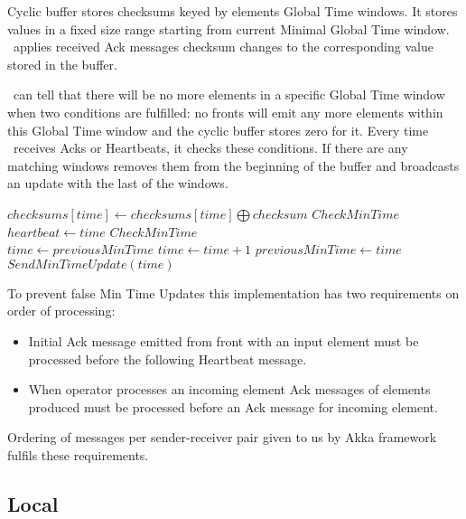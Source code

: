 Cyclic buffer stores checksums keyed by elements Global Time windows. It stores values in a fixed size range starting from current Minimal Global Time window. \tracker\ applies received Ack messages checksum changes to the corresponding value stored in the buffer.

\tracker\ can tell that there will be no more elements in a specific Global Time window when two conditions are fulfilled: no fronts will emit any more elements within this Global Time window and the cyclic buffer stores zero for it. Every time \tracker\ receives Acks or Heartbeats, it checks these conditions. If there are any matching windows \tracker removes them from the beginning of the buffer and broadcasts an update with the last of the windows.

\begin{algorithm}
\caption{\tracker}
\begin{algorithmic}[1]
\State $checksums[time] \gets checksums[time] \bigoplus checksum$
\State $CheckMinTime$
\EndProcedure
\\
\State $heartbeat \gets time$
\State $CheckMinTime$
\EndProcedure
\\
\State $time \gets previousMinTime$
\State $time \gets time + 1$
\EndWhile
{}
\State $previousMinTime \gets time$
\State $SendMinTimeUpdate(time)$
\EndIf
\EndProcedure
\end{algorithmic}
\end{algorithm}

To prevent false Min Time Updates this implementation has two requirements on order of processing:

\begin{itemize}
	\item Initial Ack message emitted from front with an input element must be processed before the following Heartbeat message.
	\item When operator processes an incoming element Ack messages of elements produced must be processed before an Ack message for incoming element.
\end{itemize}

Ordering of messages per sender-receiver pair given to us by Akka framework fulfils these requirements.

\subsection{Local \tracker\ }

